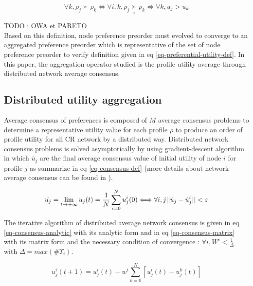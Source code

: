 \documentclass[conference]{IEEEtran}
\newcommand{\preferal}[1]{\underset{#1}{\succ}}
\begin{document}
\begin{equation}
\label{eq-preferential-utility-def}
\displaystyle
\forall k, \rho_j \succ \rho_k \Longleftrightarrow \forall i,k,  \rho_j \preferal{i} \rho_k \Longleftrightarrow \forall k, u_j > u_k
\end{equation}

TODO : OWA et PARETO\\

Based on this definition, node preference preorder must evolved to converge to an aggregated preference preorder which is representative of the set of node preference preorder to verify definition given in eq \ref{eq-preferential-utility-def}. In this paper, the aggregation operator studied is the profile utility average through distributed network average consensus.

\subsection{Distributed utility aggregation}
Average consensus of preferences is composed of $M$ average consensus problems to determine a representative utility value for each profile $\rho$ to produce an order of profile utility for all CR network by a distributed way. Distributed network consensus problems is solved asymptotically by using gradient-descent algorithm in which $\dot{u_j}$ are the final average consensus value of initial utility of node $i$ for profile $j$ as summarize in eq \ref{eq-consensus-def} (more details about network average consensus can be found in \cite{Ren2005}). 

\begin{equation}
\label{eq-consensus-def}
\displaystyle
\dot{u_j} =  \lim_{t \to +\infty } u_j(t)  =  {1 \over N } \sum_{i=0}^N u_j^i(0)  \Longleftrightarrow \forall i,j || \dot{u}_j - \dot{u}_j^i || < \varepsilon
\end{equation}

The iterative algorithm of distributed average network consensus is given in eq \ref{eq-consensus-analytic} with its analytic form and in eq \ref{eq-consensus-matrix} with its matrix form and the necessary condition of convergence : $\forall i, W^i < \frac{1}{\Delta}$ with $\Delta = max(\#\Upsilon_i)$.

\begin{equation}
\label{eq-consensus-analytic}
\displaystyle
u_j^i(t+1) = u_j^i(t) - w^i \sum_{k=0}^N[u_j^i(t) - u_j^k(t)]
\end{equation}
\end{document}
